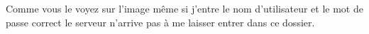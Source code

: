 \documentclass{article}
\begin{document}
\begin{enumerate}
\begin{enumerate}
   \vspace{0.6cm}  
	\warning Comme vous le voyez sur l'image même si j'entre le nom d'utilisateur et le mot de passe correct le serveur n'arrive pas à me laisser entrer dans ce dossier.  
  \end{enumerate}
\end{enumerate}
\end{document}
